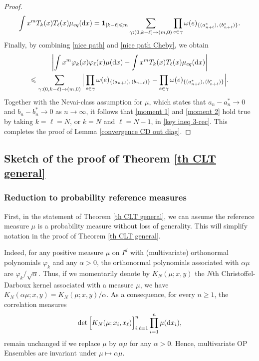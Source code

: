 \documentclass[a4paper,11pt]{article}
\numberwithin{equation}{section}
\theoremstyle{definition}
\newcommand{\eq}{\begin{equation}}
\newcommand{\qe}{\end{equation}}
\newcommand{\bv}{\mathbf}
\renewcommand{\leq}{\leqslant}
\renewcommand{\geq}{\geqslant}
\renewcommand{\phi}{\varphi}
\renewcommand{\d}{ {\rm d}}
\begin{document}
\begin{proof}
\eq
\label{nice path Cheby}
\int x^m T_k(x)T_{\ell}(x)\mu_{eq}(\d x)=\bv 1_{|k-\ell|\leq m} \sum_{\gamma:(0,k-\ell)\rightarrow (m,0)} \prod_{e\in\gamma}\omega(e)_{\{(a^*_{n+\ell}),\,(b^*_{n+\ell})\}}.
\qe
Finally,  by combining  \eqref{nice path} and \eqref{nice path Cheby}, we obtain
\begin{multline}
\label{key ineq 3-rec}
\left| \int x^m \phi_k(x)\phi_{\ell}(x)\mu(\d x) -  \int x^m T_k(x)T_{\ell}(x)\mu_{eq}(\d x)\right| \\
\leq \sum_{\gamma:(0,k-\ell)\rightarrow (m,0)} \Big|\prod_{e\in\gamma} \omega(e)_{\{(a_{n+\ell}),\,(b_{n+\ell})\}}- \prod_{e\in\gamma}\omega(e)_{\{(a^*_{n+\ell}),\,(b^*_{n+\ell})\}}\Big|.
\end{multline}
Together with the Nevai-class assumption for $\mu$, which states that $a_n- a_n^*\to 0$ and $b_n- b_n^*\to 0$ as $n\to\infty$, it follows that \eqref{moment 1} and \eqref{moment 2} hold true by taking $k=\ell=N$, or $k=N$ and $\ell=N-1$, in \eqref{key ineq 3-rec}. This completes the proof of Lemma \ref{convergence CD out diag}.

\end{proof}



\subsection{Sketch of the proof of Theorem \ref{th CLT general}}
\label{s:sketch proof CLT MOPE}


\subsubsection{Reduction to probability reference measures}
\label{s:reductionToProba}
First, in the statement of Theorem \ref{th CLT general}, we can assume the reference measure  $\mu$ is a probability measure without loss of generality. This will simplify notation in the proof of Theorem \ref{th CLT general}.

Indeed,  for any positive measure $\mu$ on $I^d$ with (multivariate) orthonormal
polynomials $\phi_k$ and any $\alpha>0$, the orthonormal polynomials associated
with $\alpha\mu$ are $\phi_k/\sqrt\alpha$. Thus, if we momentarily denote by $K_N(\mu;x,y)$ the $N$th Christoffel-Darboux kernel associated with a measure $\mu$, we have $K_N(\alpha\mu;x,y)=K_N(\mu;x,y)/\alpha$. As a consequence, for every $n\geq 1$, the correlation measures
\[
\det\Big[K_N(\mu; x_i,x_\ell)\Big]_{i,\ell=1}^n\prod_{i=1}^n\mu(\d x_i),
\]
remain unchanged if we replace $\mu$ by $\alpha\mu$ for any $\alpha>0$. Hence,
multivariate OP Ensembles are invariant under $\mu\mapsto\alpha\mu$.
\end{document}
